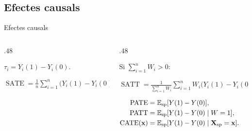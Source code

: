 \documentclass{bestbeamer}
\begin{document}
\subsection{Efectes causals}
\begin{frame}{Efectes causals}
  \begin{columns}[T,onlytextwidth]
    \begin{column}{.48\textwidth}
      \begin{definition}[ATE]\label{def:efectecausalindividual}
        \centering
        \vspace{1mm}
        \(\displaystyle \tau_i=Y_i(1)-Y_i(0).\)
        \vspace{1mm}
      \end{definition}
      \begin{definition}[SATE]\label{def:ate-sate}
        \centering
        \vspace{1mm}
        \(\displaystyle
          \operatorname{SATE}=\frac{1}{n}\sum_{i=1}^n\bigl(Y_i(1)-Y_i(0)\bigr).
        \)
        \vspace{1mm}
      \end{definition}
    \end{column}
    \begin{column}{.48\textwidth}
      \begin{definition}[SATT]
        \small
        Si \(\sum_{i=1}^n W_i>0\):\par\vspace{1mm}\centering
        \(\displaystyle
          \operatorname{SATT}=
          \frac{1}{\sum_{i=1}^n W_i}
          \sum_{i=1}^n W_i\bigl(Y_i(1)-Y_i(0)\bigr).
        \)
      \end{definition}
      \begin{definition}\label{def:pate-patt-cate}
        \centering
        \vspace{1mm}
        \(\displaystyle
          \begin{aligned}
            \operatorname{PATE} &= \mathbb{E}_{\mathrm{sp}}[Y(1)-Y(0)],\\
            \operatorname{PATT} &= \mathbb{E}_{\mathrm{sp}}[Y(1)-Y(0)\mid W=1], \\
            \operatorname{CATE}(\mathbf{x}) &= \mathbb{E}_{\mathrm{sp}}[Y(1)-Y(0)\mid \mathbf{X}_{\mathrm{sp}}=\mathbf{x}].
          \end{aligned}
        \)
        \vspace{1mm}
      \end{definition}
    \end{column}
  \end{columns}
\end{frame}
\end{document}

